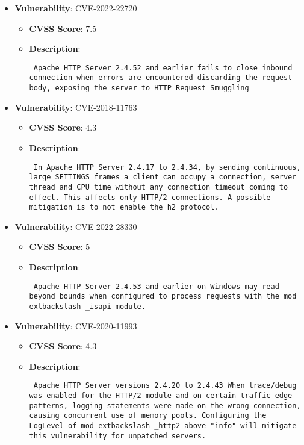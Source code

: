 \documentclass{article}
\begin{document}
\begin{itemize}
        \item \textbf{Vulnerability}: CVE-2022-22720
        \begin{itemize}
            \item \textbf{CVSS Score}:  7.5 
            \item \textbf{Description}: \parbox{\linewidth}{\texttt{ Apache HTTP Server 2.4.52 and earlier fails to close inbound connection when errors are encountered discarding the request body, exposing the server to HTTP Request Smuggling }}
        \end{itemize}
    
        \item \textbf{Vulnerability}: CVE-2018-11763
        \begin{itemize}
            \item \textbf{CVSS Score}:  4.3 
            \item \textbf{Description}: \parbox{\linewidth}{\texttt{ In Apache HTTP Server 2.4.17 to 2.4.34, by sending continuous, large SETTINGS frames a client can occupy a connection, server thread and CPU time without any connection timeout coming to effect. This affects only HTTP/2 connections. A possible mitigation is to not enable the h2 protocol. }}
        \end{itemize}
    
        \item \textbf{Vulnerability}: CVE-2022-28330
        \begin{itemize}
            \item \textbf{CVSS Score}:  5 
            \item \textbf{Description}: \parbox{\linewidth}{\texttt{ Apache HTTP Server 2.4.53 and earlier on Windows may read beyond bounds when configured to process requests with the mod	extbackslash _isapi module. }}
        \end{itemize}
    
        \item \textbf{Vulnerability}: CVE-2020-11993
        \begin{itemize}
            \item \textbf{CVSS Score}:  4.3 
            \item \textbf{Description}: \parbox{\linewidth}{\texttt{ Apache HTTP Server versions 2.4.20 to 2.4.43 When trace/debug was enabled for the HTTP/2 module and on certain traffic edge patterns, logging statements were made on the wrong connection, causing concurrent use of memory pools. Configuring the LogLevel of mod	extbackslash _http2 above "info" will mitigate this vulnerability for unpatched servers. }}
        \end{itemize}
    

\end{itemize}
\end{document}
